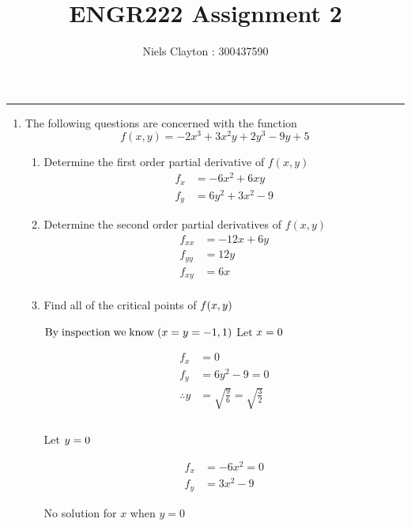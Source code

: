 \documentclass[a4paper,11pt]{article}
\begin{document}
\begin{preview}
\title{\LARGE{\textbf{ENGR222 Assignment 2}}}
\author{Niels Clayton : 300437590}
\date{}
\maketitle
\hrule

\begin{enumerate}
    \item The following questions are concerned with the function
    $$ f(x,y) = -2x^3 + 3x^2y + 2y^3 - 9y +5$$

    \begin{enumerate}
        \item Determine the first order partial derivative of $f(x, y)$
        \begin{align*}
            f_x &= -6x^2 + 6xy \\
            f_y &=  6y^2 + 3x^2 - 9
        \end{align*}
    
        \item Determine the second order partial derivatives of $f(x, y)$
        \begin{align*}
            f_{xx} &= -12x + 6y\\
            f_{yy} &= 12y \\
            f_{xy} &= 6x\\
        \end{align*}
    
        \item Find all of the critical points of $f(x, y)\\$

            $\mathrm{By \; inspection \; we \; know \;}  (x=y= -1,1)\\\\$
            Let $x = 0\\$

            \begin{align*}
                f_{x} &= 0 \\
                f_{y} &= 6y^2 - 9 = 0\\
                \therefore y &= \sqrt{\frac{9}{6}} = \sqrt{\frac{3}{2}}\\\\
            \end{align*}

            Let $y = 0\\$

            \begin{align*}
                f_{x} &= -6x^2 = 0 \\
                f_{y} &= 3x^2 -9 
            \end{align*}
            \begin{center}
                No solution for $x$ when $y=0$ \newline
            \end{center}


\end{enumerate}
\end{enumerate}
\end{preview}
\end{document}
